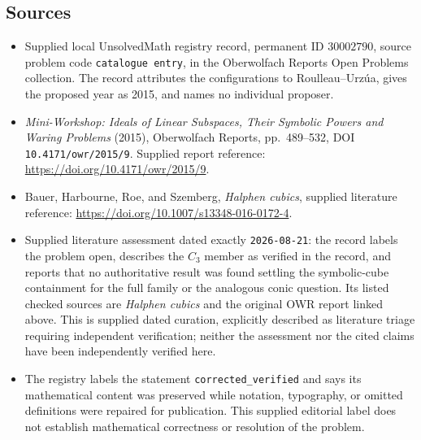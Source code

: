 \documentclass[11pt]{article}
\begin{document}
\subsection{Sources}
\begin{itemize}
\item Supplied local UnsolvedMath registry record, permanent ID \(30002790\), source problem code \texttt{catalogue entry}, in the Oberwolfach Reports Open Problems collection. The record attributes the configurations to Roulleau--Urz\'{u}a, gives the proposed year as 2015, and names no individual proposer.
\item \emph{Mini-Workshop: Ideals of Linear Subspaces, Their Symbolic Powers and Waring Problems} (2015), Oberwolfach Reports, pp.~489--532, DOI \texttt{10.4171/owr/2015/9}. Supplied report reference: \url{https://doi.org/10.4171/owr/2015/9}.
\item Bauer, Harbourne, Roe, and Szemberg, \emph{Halphen cubics}, supplied literature reference: \url{https://doi.org/10.1007/s13348-016-0172-4}.
\item Supplied literature assessment dated exactly \texttt{2026-08-21}: the record labels the problem open, describes the \(C_3\) member as verified in the record, and reports that no authoritative result was found settling the symbolic-cube containment for the full family or the analogous conic question. Its listed checked sources are \emph{Halphen cubics} and the original OWR report linked above. This is supplied dated curation, explicitly described as literature triage requiring independent verification; neither the assessment nor the cited claims have been independently verified here.
\item The registry labels the statement \texttt{corrected\_verified} and says its mathematical content was preserved while notation, typography, or omitted definitions were repaired for publication. This supplied editorial label does not establish mathematical correctness or resolution of the problem.
\end{itemize}
\end{document}
